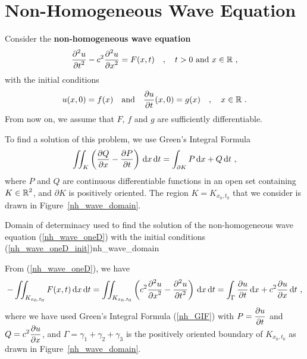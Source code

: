 \section{Non-Homogeneous Wave Equation}

Consider the {\bfseries non-homogeneous wave equation}%
\begin{equation} \label{nh_wave_oneD}
\frac{\displaystyle \partial^{2}{u}} {\displaystyle \partial t^{2}} - c^2 \frac{\displaystyle \partial^{2}{u}} {\displaystyle \partial x^{2}} = F(x,t) \quad , \quad
t >0 \ \text{and} \ x \in \mathbb{R}\ ,  
\end{equation}
with the initial conditions
\begin{equation} \label{nh_wave_oneD_init}
u(x,0)= f(x) \quad \text{and} \quad \frac{\partial{u}}{\partial t}(x,0) = g(x) \quad ,
\quad x \in \mathbb{R} \ .
\end{equation}
From now on, we assume that $F$, $f$ and $g$ are sufficiently
differentiable.

To find a solution of this problem, we use Green's Integral Formula
\begin{equation}\label{nh_GIF}
\iint_K \left( \frac{\partial{Q}}{\partial x} - \frac{\partial{P}}{\partial t} \right) \,\mathrm{d}{x}\,\mathrm{d}{t}
= \int_{\partial K} P \,\mathrm{d}{x} + Q \,\mathrm{d}{t} \ ,
\end{equation}
where $P$ and $Q$ are continuous differentiable functions in an open
set containing $\displaystyle K \in \mathbb{R}^2$, and $\partial K$ is positively
oriented.  The region $K  = K_{x_0,t_0}$ that we consider is
drawn in Figure~\ref{nh_wave_domain}.

{Domain of determinacy used to find the solution of the
non-homogeneous wave equation (\ref{nh_wave_oneD}) with the initial
conditions (\ref{nh_wave_oneD_init})}{nh_wave_domain}

From (\ref{nh_wave_oneD}), we have
\[
-\iint_{K_{x_0,t_0}} F(x,t) \dx{x}\dx{t} = \iint_{K_{x_0,t_0}} \left(
c^2 \pdydxn{u}{x}{2} - \pdydxn{u}{t}{2} \right) \dx{x}\dx{t}
= \int_{\Gamma} \pdydx{u}{t} \dx{x} + c^2 \pdydx{u}{x} \dx{t} \ ,
\]
where we have used Green's Integral Formula (\ref{nh_GIF}) with
$\displaystyle P = \frac{\partial{u}}{\partial t}$ and
$\displaystyle Q = c^2 \frac{\partial{u}}{\partial x}$, and
$\Gamma = \gamma_1 + \gamma_2 + \gamma_3$ is the positively oriented
boundary of $K_{x_0,t_0}$ as drawn in Figure~\ref{nh_wave_domain}.

